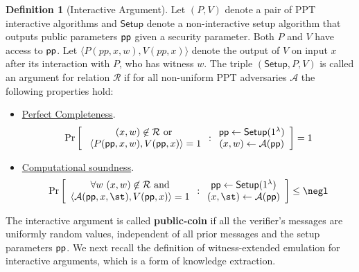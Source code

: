 \documentclass{article}
\theoremstyle{definition}
\newtheorem{definition}{Definition}
\begin{document}
\begin{definition} [Interactive Argument]
Let $(P, V)$ denote a pair of PPT interactive algorithms and $\textsf{Setup}$ denote a non-interactive setup algorithm that outputs public parameters $\textsf{pp}$ given a security parameter. Both $P$ and $V$ have access to $\textsf{pp}$. Let $\langle P(pp, x, w), V(pp, x) \rangle$ denote the output of $V$ on input $x$ after its interaction with $P$, who has witness $w$. The triple $(\textsf{Setup}, P, V)$ is called an argument for relation $\mathcal{R}$ if for all non-uniform PPT adversaries $\mathcal{A}$ the following properties hold: 

\begin{itemize}
\item \underline{Perfect Completeness}. 
\[
\Pr \left[
\begin{array}{c}
        (x, w) \not \in  \mathcal{R} \ \text{or} \\
         \ \langle P(\textsf{pp}, x, w), V(\textsf{pp}, x) \rangle = 1 \\
\end{array}
:
\begin{array}{c}
             \textsf{pp} \leftarrow \textsf{Setup}(1^\lambda) \\
             (x, w) \leftarrow \mathcal{A}(\textsf{pp}) \\
\end{array} 
\right]  = 1 
 \]

\item \underline{Computational soundness}. 
\[
\Pr \left[
\begin{array}{c}
        \forall w \ (x, w) \not\in  \mathcal{R} \ \text{and} \\ 
         \langle \mathcal{A}(\params, x, \st), V(\params, x) \rangle = 1 
\end{array}
:
\begin{array}{c}
             \params \leftarrow \textsf{Setup}(1^\lambda) \\
             (x, \st) \leftarrow \mathcal{A}(\params) \\
\end{array}
        \right] \leq \negl
\]
\end{itemize} 
\end{definition} 

The interactive argument is called \textbf{public-coin} if all the verifier's messages are uniformly random values, independent of all prior messages and the setup parameters $\textsf{pp}$. 
We next recall the definition of witness-extended emulation for interactive arguments, which is a form of knowledge extraction.  
\end{document}
